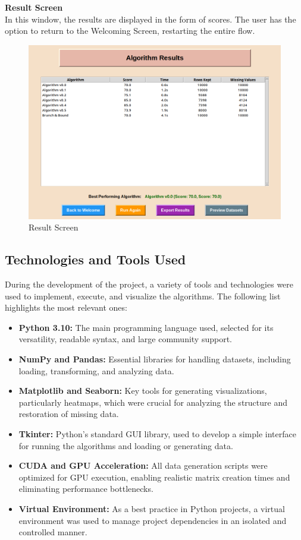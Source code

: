 \documentclass[a4paper,12pt]{article}
\begin{document}
\textbf{Result Screen} \\
In this window, the results are displayed in the form of scores. The user has the option to return to the Welcoming Screen, restarting the entire flow.

\begin{figure}[H]
\centering
\includegraphics[width=0.5\linewidth]{Results.png}
\caption{Result Screen}
\end{figure}

\subsection{Technologies and Tools Used}

During the development of the project, a variety of tools and technologies were used to implement, execute, and visualize the algorithms. The following list highlights the most relevant ones:

\begin{itemize}
    \item \textbf{Python 3.10:} The main programming language used, selected for its versatility, readable syntax, and large community support.
    
    \item \textbf{NumPy and Pandas:} Essential libraries for handling datasets, including loading, transforming, and analyzing data.
    
    \item \textbf{Matplotlib and Seaborn:} Key tools for generating visualizations, particularly heatmaps, which were crucial for analyzing the structure and restoration of missing data.
    
    \item \textbf{Tkinter:} Python’s standard GUI library, used to develop a simple interface for running the algorithms and loading or generating data.
    
    \item \textbf{CUDA and GPU Acceleration:} All data generation scripts were optimized for GPU execution, enabling realistic matrix creation times and eliminating performance bottlenecks.
    
    \item \textbf{Virtual Environment:} As a best practice in Python projects, a virtual environment was used to manage project dependencies in an isolated and controlled manner.
\end{itemize}
\end{document}
